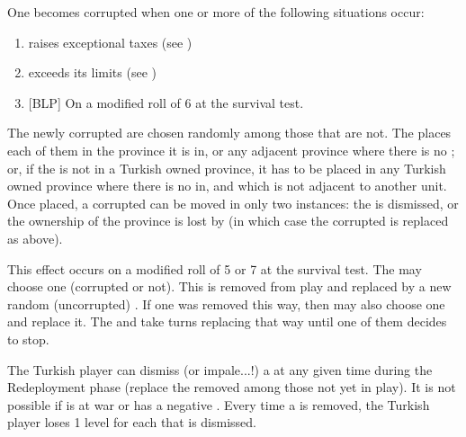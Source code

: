 \aparag[Decadence.] One \Pasha becomes corrupted when one or more of the
following situations occur:
\begin{enumerate}
\item \TUR raises exceptional taxes (see )
\item \TUR exceeds its \MNU limits (see )
\item {[BLP]} On a modified roll of 6 at the survival test.
\end{enumerate}
\bparag The newly corrupted \Pashas are chosen randomly among those that
are not. The  places each of
them in the province it is in, or any adjacent province where there is
no \Pasha; or, if the \Pasha is not in a Turkish owned province, it has
to be placed in any Turkish owned province where there is no \Pasha in,
and which is not adjacent to another \Pasha unit. Once placed, a
corrupted \Pasha can be moved in only two instances: the \Pasha is
dismissed, or the ownership of the province is lost by \TUR (in which
case the corrupted \Pasha is replaced as above).

 This effect occurs on a modified roll
of 5 or 7 at the survival test.
\bparag The  may choose one
\Pasha (corrupted or not). This \Pasha is removed from play and
replaced by a new random (uncorrupted) \Pasha.
\bparag If one \Pasha was removed this way, then \TUR may also choose
one and replace it.
\bparag The  and \TUR take
turns replacing \Pashas that way until one of them decides to stop.

 The Turkish player can dismiss (or
impale...!) a \Pasha at any given time during the Redeployment phase
(replace the removed \Pasha among those not yet in play). It is not
possible if \TUR is at war or has a negative \STAB.  Every time a \Pasha
is removed, the Turkish player loses 1 \STAB level for each \Pasha that
is dismissed.

